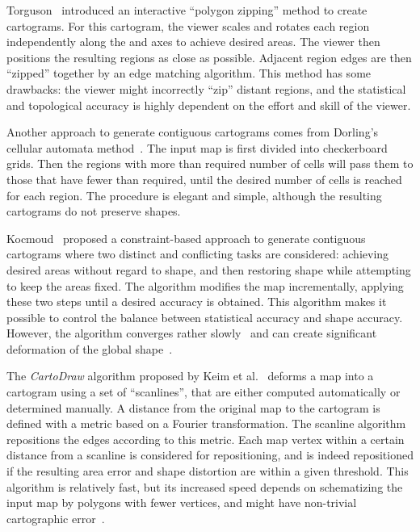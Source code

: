 \documentclass{egpubl}
\begin{document}
Torguson~\cite{torguson1990cartogram} introduced an interactive ``polygon zipping'' method to create cartograms. For this cartogram, the viewer scales and rotates each region independently along the  and  axes to achieve desired areas. The viewer then positions the resulting regions as close as possible. Adjacent region edges are then ``zipped'' together by an edge matching algorithm.
 This method has some drawbacks: the viewer might incorrectly ``zip'' distant regions, and the statistical and topological accuracy is highly dependent on the effort and skill of the viewer.


 Another approach to generate contiguous cartograms comes from Dorling's cellular automata method~\cite{dorling96}. The input map is first divided into checkerboard grids. Then the regions with more than required number of cells will pass them to those that have fewer than required, until the desired number of cells is reached for each region. The procedure is elegant and simple, although the resulting cartograms do not preserve shapes.

Kocmoud~\cite{kocmoud1997constructing} proposed a constraint-based approach to generate contiguous cartograms where two distinct and conflicting tasks are considered: achieving desired areas without regard to shape, and then restoring shape while attempting to keep the areas fixed. The algorithm modifies the map incrementally, applying these two steps until a desired accuracy is obtained. This algorithm makes it possible to control the balance between statistical accuracy and shape accuracy. However, the algorithm
converges rather slowly~\cite{GN04} and can create significant deformation of the global shape~\cite{KNP04}. 


The \textit{CartoDraw} algorithm proposed by Keim et al.~\cite{KNP04} deforms a map into a cartogram using a set of ``scanlines'', that are either computed automatically or determined manually.
A distance from the original map to the cartogram is defined with a metric based on a Fourier transformation. The scanline algorithm repositions the edges according to this metric. Each map vertex within a certain distance from a scanline is considered for repositioning, and is indeed repositioned if the resulting area error and shape distortion are within a given threshold. This algorithm is relatively fast, but its increased speed depends on schematizing the input map by polygons with fewer vertices, and might have non-trivial cartographic error~\cite{GN04}. 
\end{document}
